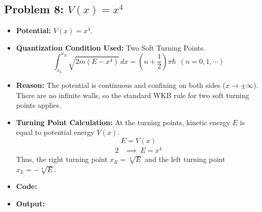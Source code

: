 \documentclass[12pt, a4paper, twoside]{article}
\begin{document}
        \subsection{Problem 8: \texorpdfstring{$V(x) = x^4$}{V(x) = x\^{}4}}
        \begin{itemize}
            \item {\bf Potential: } $V(x) = x^4$.
            \item {\bf Quantization Condition Used: } Two Soft Turning Points. $${\int_{x_L}^{x_R} \sqrt{2m(E - x^4)} \, dx} = {\left(n + \frac{1}{2}\right) \pi \hbar} ~~ (n = 0, 1, \cdots)$$
            \item {\bf Reason: }  The potential is continuous and confining on both sides ($x \to \pm \infty$). There are no infinite walls, so the standard WKB rule for two soft turning points applies.
            \item {\bf Turning Point Calculation: } At the turning points, kinetic energy $E$ is equal to potential energy $V(x)$. $$E = V(x)$$ \begin{alignat*}{2}
                &\implies ~ E = x^4
            \end{alignat*}
            Thus, the right turning point $ \boxed{x_R = \sqrt[4]{E}}$ and the left turning point $\boxed{x_L = -\sqrt[4]{E}}$.
            \item {\bf Code: } 
            \item {\bf Output: } 
        \end{itemize}
        
\end{document}
